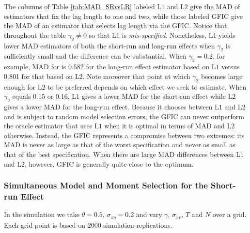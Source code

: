 The columns of Table \ref{tab:MAD_SRvsLR} labeled $\mbox{L1}$ and $\mbox{L2}$ give the MAD of estimators that fix the lag length to one and two, while those labeled GFIC give the MAD of an estimator that selects lag length via the GFIC.
Notice that throughout the table $\gamma_2 \neq 0$ so that $\mbox{L1}$ is \emph{mis-specified}.
Nonetheless, $\mbox{L1}$ yields lower MAD estimators of both the short-run and long-run effects when $\gamma_2$ is sufficiently small and the difference can be substantial.
When $\gamma_2 = 0.2$, for example, MAD for is 0.582 for the long-run effect estimator based on $\mbox{L1}$ versus 0.801 for that based on $\mbox{L2}$.
Note moreover that point at which $\gamma_2$ becomes large enough for $\mbox{L2}$ to be preferred depends on which effect we seek to estimate.
When $\gamma_2$ equals 0.15 or 0.16, $\mbox{L1}$ gives a lower MAD for the short-run effect while $\mbox{L2}$ gives a lower MAD for the long-run effect.
Because it chooses between $\mbox{L1}$ and $\mbox{L2}$ and is subject to random model selection errors, the GFIC can never outperform the oracle estimator that uses $\mbox{L1}$ when it is optimal in terms of MAD and $\mbox{L2}$ otherwise.
Instead, the GFIC represents a compromise between two extremes: its MAD is never as large as that of the worst specification and never as small as that of the best specification.
When there are large MAD differences between $\mbox{L1}$ and $\mbox{L2}$, however, GFIC is generally quite close to the optimum.


\subsubsection{Simultaneous Model and Moment Selection for the Short-run Effect}

In the simulation we take $\theta = 0.5$, $\sigma_{x\eta}=0.2$ and vary $\gamma$, $\sigma_{xv}$, $T$ and $N$ over a grid.
Each grid point is based on 2000 simulation replications.

